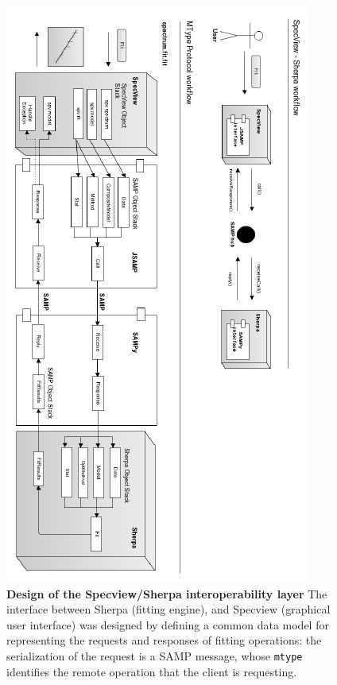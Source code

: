 \documentclass[5p]{elsarticle}
\begin{document}
\begin{figure}
\label{fig:sherpasamp}
\begin{center}
\includegraphics[width=\columnwidth]{figures/sherpasamp.png}
\caption{\textbf{Design of the Specview/Sherpa interoperability layer} The interface between Sherpa (fitting engine), and Specview (graphical user interface) was designed by defining a common data model for representing the requests and responses of fitting operations: the serialization of the request is a SAMP message, whose \texttt{mtype} identifies the remote operation that the client is requesting.}
\end{center}
\end{figure}
\end{document}
